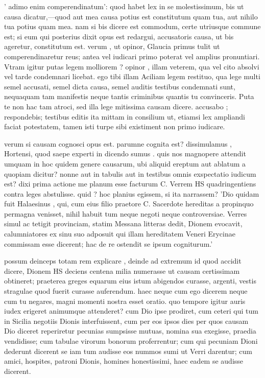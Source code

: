  ' adimo enim comperendinatum': quod habet lex in se molestissimum, bis ut causa dicatur,—quod aut mea causa potius est constitutum quam tua, aut nihilo tua potius quam mea. nam si bis dicere est commodum, certe utriusque commune est; si eum qui posterius dixit opus est redargui, accusatoris causa, ut bis ageretur, constitutum est. verum , ut opinor, Glaucia primus tulit ut comperendinaretur reus; antea vel iudicari primo poterat vel amplius pronuntiari. Vtram igitur putas legem molliorem ? opinor , illam veterem, qua vel cito absolvi vel tarde condemnari licebat. ego tibi illam Aciliam legem restituo, qua lege multi semel accusati, semel dicta causa, semel auditis testibus condemnati sunt, nequaquam tam manifestis neque tantis criminibus quantis tu convinceris. Puta te non hac tam atroci, sed illa lege mitissima causam dicere. accusabo ; respondebis; testibus editis ita mittam in consilium ut, etiamsi lex ampliandi faciat potestatem, tamen isti turpe sibi existiment non primo iudicare.

 verum si causam cognosci opus est. parumne cognita est? dissimulamus , Hortensi, quod saepe experti in dicendo sumus . quis nos magnopere attendit umquam in hoc quidem genere causarum, ubi aliquid ereptum aut ablatum a quopiam dicitur? nonne aut in tabulis aut in testibus omnis exspectatio iudicum est? dixi prima actione me planum esse facturum C. Verrem HS quadringentiens contra leges abstulisse. quid ? hoc planius egissem, si ita narrassem? 'Dio quidam fuit Halaesinus , qui, cum eius filio praetore C. Sacerdote hereditas a propinquo permagna venisset, nihil habuit tum neque negoti neque controversiae. Verres simul ac tetigit provinciam, statim Messana litteras dedit, Dionem evocavit, calumniatores ex sinu suo adposuit qui illam hereditatem Veneri Erycinae commissam esse dicerent; hac de re ostendit se ipsum cogniturum.'

 possum deinceps totam rem explicare , deinde ad extremum id quod accidit dicere, Dionem HS deciens centena milia numerasse ut causam certissimam obtineret; praeterea greges equarum eius istum abigendos curasse, argenti, vestis stragulae quod fuerit curasse auferendum. haec neque cum ego dicerem neque cum tu negares, magni momenti nostra esset oratio. quo tempore igitur auris iudex erigeret animumque attenderet? cum Dio ipse prodiret, cum ceteri qui tum in Sicilia negotiis Dionis interfuissent, cum per eos ipsos dies per quos causam Dio diceret reperiretur pecunias sumpsisse mutuas, nomina sua exegisse, praedia vendidisse; cum tabulae virorum bonorum proferrentur; cum qui pecuniam Dioni dederunt dicerent se iam tum audisse eos nummos sumi ut Verri darentur; cum amici, hospites, patroni Dionis, homines honestissimi, haec eadem se audisse dicerent.

